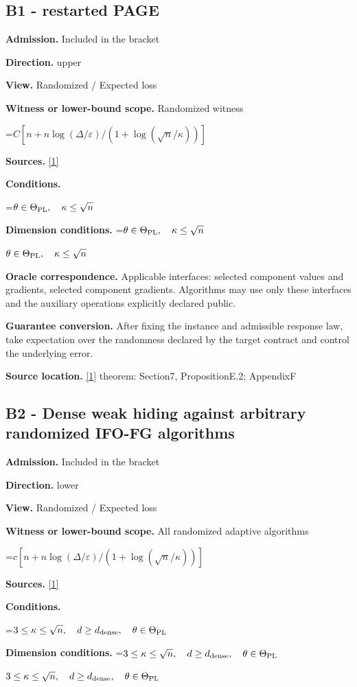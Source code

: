 \documentclass[10pt,a4paper]{article}
\newcommand{\AtlasMath}[1]{\par\begingroup\centering\setbox0=\hbox{$\displaystyle #1$}\ifdim\wd0>1.4\linewidth\typeout{ATLAS WIDE FORMULA: \the\wd0}\fi\ifdim\wd0>\linewidth\resizebox{\linewidth}{!}{\box0}\else\box0\fi\par\endgroup}
\newcommand{\AtlasInlineMath}[1]{\begingroup\setbox0=\hbox{$#1$}\ifdim\wd0>.4\linewidth\endgroup\AtlasMath{#1}\else\endgroup$#1$\fi}
\begin{document}
\subsection{B1 - restarted PAGE}
\textbf{Admission.} Included in the bracket

\textbf{Direction.} upper

\textbf{View.} Randomized / Expected loss

\textbf{Witness or lower-bound scope.} Randomized witness

\AtlasMath{C[n+n\log(\Delta/\varepsilon)/(1+\log(\sqrt n/\kappa))]}
\textbf{Sources.} \href{https://arxiv.org/pdf/2609.00045v3}{[1]}

\textbf{Conditions.} 
\AtlasMath{\theta\in\Theta_{\rm PL},\quad\kappa\le\sqrt n}


\textbf{Dimension conditions.} \AtlasInlineMath{\theta\in\Theta_{\rm PL},\quad\kappa\le\sqrt n}

\textbf{Oracle correspondence.} Applicable interfaces: selected component values and gradients, selected component gradients. Algorithms may use only these interfaces and the auxiliary operations explicitly declared public.

\textbf{Guarantee conversion.} After fixing the instance and admissible response law, take expectation over the randomness declared by the target contract and control the underlying error.

\textbf{Source location.} \href{https://arxiv.org/pdf/2609.00045v3}{[1]} theorem: Section7, PropositionE.2; AppendixF

\subsection{B2 - Dense weak hiding against arbitrary randomized IFO-FG algorithms}
\textbf{Admission.} Included in the bracket

\textbf{Direction.} lower

\textbf{View.} Randomized / Expected loss

\textbf{Witness or lower-bound scope.} All randomized adaptive algorithms

\AtlasMath{c[n+n\log(\Delta/\varepsilon)/(1+\log(\sqrt n/\kappa))]}
\textbf{Sources.} \href{https://arxiv.org/pdf/2609.00045v3}{[1]}

\textbf{Conditions.} 
\AtlasMath{3\le\kappa\le\sqrt n,\quad d\ge d_{\rm dense},\quad\theta\in\Theta_{\rm PL}}


\textbf{Dimension conditions.} \AtlasInlineMath{3\le\kappa\le\sqrt n,\quad d\ge d_{\rm dense},\quad\theta\in\Theta_{\rm PL}}
\end{document}
